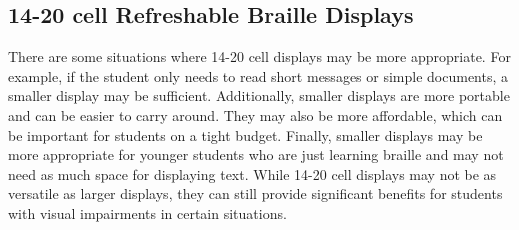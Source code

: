 \documentclass[14pt,letterpaper,twoside]{extreport}
\begin{document}
\pagebreak 
	\hypertarget{few-cell-refreshable-braille-displays}{}\subsection{14-20 cell Refreshable Braille
		Displays}\label{few-cell-refreshable-braille-displays}
There are some situations where 14-20 cell displays may be more appropriate. For example, if the student only needs to read short messages or simple documents, a smaller display may be sufficient. Additionally, smaller displays are more portable and can be easier to carry around. They may also be more affordable, which can be important for students on a tight budget. Finally, smaller displays may be more appropriate for younger students who are just learning braille and may not need as much space for displaying text. While 14-20 cell displays may not be as versatile as larger displays, they can still provide significant benefits for students with visual impairments in certain situations.
\end{document}
